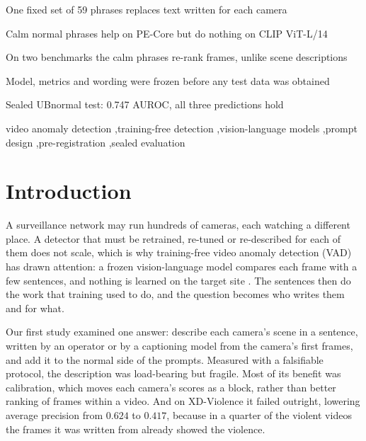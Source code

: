 \documentclass[a4paper,fleqn]{cas-sc}
\begin{document}
\begin{highlights}
\item One fixed set of 59 phrases replaces text written for each camera
\item Calm normal phrases help on PE-Core but do nothing on CLIP ViT-L/14
\item On two benchmarks the calm phrases re-rank frames, unlike scene descriptions
\item Model, metrics and wording were frozen before any test data was obtained
\item Sealed UBnormal test: 0.747 AUROC, all three predictions hold
\end{highlights}

\begin{keywords}
video anomaly detection \sep training-free detection \sep vision-language models
\sep prompt design \sep pre-registration \sep sealed evaluation
\end{keywords}

\maketitle

\section{Introduction}
\label{sec:intro}

A surveillance network may run hundreds of cameras, each watching a different place.
A detector that must be retrained, re-tuned or re-described for each of them does not
scale, which is why training-free video anomaly detection (VAD) has drawn attention:
a frozen vision-language model compares each frame with a few sentences, and nothing
is learned on the target site
\citep{zanella2024lavad, anyanomaly2025, yin2026nova, lee2025flashback, zou2026askhint}.
The sentences then do the work that training used to do, and the question becomes
who writes them and for what.

Our first study \citep{sarangi2026concept} examined one answer: describe each camera's
scene in a sentence, written by an operator or by a captioning model from the
camera's first frames, and add it to the normal side of the prompts. Measured with a
falsifiable protocol, the description was load-bearing but fragile. Most of its
benefit was calibration, which moves each camera's scores as a block, rather than
better ranking of frames within a video. And on XD-Violence it failed outright,
lowering average precision from $0.624$ to $0.417$, because in a quarter of the
violent videos the frames it was written from already showed the violence.
\end{document}
